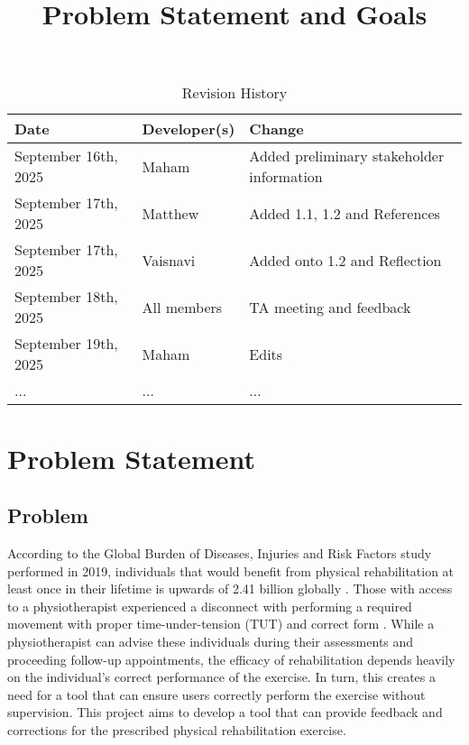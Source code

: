 \documentclass{article}
\title{Problem Statement and Goals\\\progname}
\author{\authname}
\date{}
\begin{document}
\maketitle

\begin{table}[hp]
\caption{Revision History} \label{TblRevisionHistory}
\begin{tabularx}{\textwidth}{llX}
\toprule
\textbf{Date} & \textbf{Developer(s)} & \textbf{Change}\\
\midrule
September 16th, 2025 & Maham & Added preliminary stakeholder information\\
September 17th, 2025 & Matthew & Added 1.1, 1.2 and References\\
September 17th, 2025 & Vaisnavi & Added onto 1.2 and Reflection\\
September 18th, 2025 & All members & TA meeting and feedback\\
September 19th, 2025 & Maham & Edits \\
... & ... & ...\\
\bottomrule
\end{tabularx}
\end{table}

\section{Problem Statement}

\subsection{Problem}

According to the Global Burden of Diseases, Injuries and Risk Factors study performed in 2019, 
individuals that would benefit from physical rehabilitation at least once in their 
lifetime is upwards of 2.41 billion globally \citep{CiezaEtAl2021}.
Those with access to a physiotherapist experienced a 
disconnect with performing a required movement with proper time-under-tension (TUT) and 
correct form \citep{FaberEtAl2015}. While a physiotherapist can advise these individuals
during their assessments and proceeding follow-up appointments, the efficacy of rehabilitation
depends heavily on the individual's correct performance of the exercise. In turn, this creates a need for a tool that can ensure users 
correctly perform the exercise without supervision. This project aims to develop a tool that can 
provide feedback and corrections for the prescribed physical rehabilitation exercise.
\end{document}
